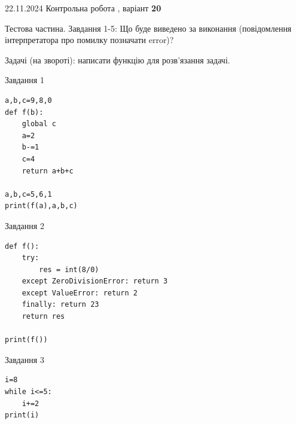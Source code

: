 \documentclass[12pt, ukrainian]{article}
\begin{document}
{{{{{{{{{{{{{{{{{{{\begin{minipage}[t]{10.7cm}
\end{minipage}

\newpage

{{22.11.2024 Контрольна робота , варіант  \No \textbf { 20 }\par}}
{

Тестова частина. Завдання 1-5: Що буде виведено за виконання (повідомлення інтерпретатора про помилку позначати error)?

Задачі (на звороті): написати функцію для розв'язання задачі.

\vspace{5mm} \begin{minipage}[t]{8.5cm}
               
{\begin{center}Завдання {1}\end{center}}
\vspace{-6mm}

\begin{verbatim}
a,b,c=9,8,0
def f(b):
    global c
    a=2
    b-=1
    c=4
    return a+b+c

a,b,c=5,6,1
print(f(a),a,b,c)
\end{verbatim}


\vspace{5mm}
               
{\begin{center}Завдання {2}\end{center}}
\vspace{-6mm}

\begin{verbatim}
def f():
    try:
        res = int(8/0)
    except ZeroDivisionError: return 3
    except ValueError: return 2
    finally: return 23
    return res

print(f())
\end{verbatim}


\vspace{5mm}
               
{\begin{center}Завдання {3}\end{center}}
\vspace{-6mm}

\begin{verbatim}
i=8
while i<=5:
    i+=2
print(i)
\end{verbatim}


\end{minipage}
\vline \hspace{6mm}
\begin{minipage}[t]{10.7cm}
               

\end{minipage}}}}}}}}}}}}}}}}}}}}}
\end{document}
